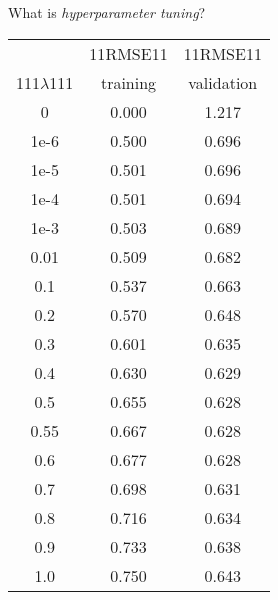 \begin{frame}{\Large What is \textit{hyperparameter tuning}?}
\begin{multicols}{2}
\columnbreak

	\begin{flushright}
	 \begin{minipage}{5.0cm}

	\begin{center}
	\begin{tabular}{|c|c|c|}
	\hline
	                  & {\color{white}11}RMSE{\color{white}11} & {\color{white}11}RMSE{\color{white}11} \\
	{\color{white}111}$\lambda${\color{white}111} & training & validation \\
	\hline\hline
	0 & 0.000 & 1.217 \\
	1e-6 & 0.500 & 0.696 \\
	1e-5 & 0.501 & 0.696 \\
	1e-4 & 0.501 & 0.694 \\
	1e-3 & 0.503 & 0.689 \\
	0.01 & 0.509 & 0.682 \\
	0.1 & 0.537 & 0.663 \\
	0.2 & 0.570 & 0.648 \\
	0.3 & 0.601 & 0.635 \\
	0.4 & 0.630 & 0.629 \\
	0.5 & 0.655 & 0.628 \\
	{\color{red}0.55} & 0.667 & {\color{red}0.628} \\
	0.6 & 0.677 & 0.628 \\
	0.7 & 0.698 & 0.631 \\
	0.8 & 0.716 & 0.634 \\
	0.9 & 0.733 & 0.638 \\
	1.0 & 0.750 & 0.643 \\
	\hline
	\end{tabular}
	\end{center}

	\end{minipage}
	\end{flushright}

\end{multicols}

\end{frame}
\normalsize

